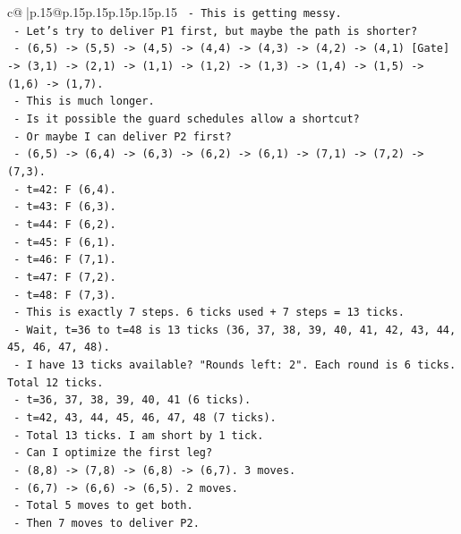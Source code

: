 \documentclass{article}
\begin{document}
{\begin{supertabular}{c@{$\;$}|p{.15\linewidth}@{}p{.15\linewidth}p{.15\linewidth}p{.15\linewidth}p{.15\linewidth}p{.15\linewidth}}
{{{\texttt{      {-} This is getting messy.} \\
\texttt{    {-} Let's try to deliver P1 first, but maybe the path is shorter?} \\
\texttt{      {-} (6,5) {-}> (5,5) {-}> (4,5) {-}> (4,4) {-}> (4,3) {-}> (4,2) {-}> (4,1) {[}Gate{]} {-}> (3,1) {-}> (2,1) {-}> (1,1) {-}> (1,2) {-}> (1,3) {-}> (1,4) {-}> (1,5) {-}> (1,6) {-}> (1,7).} \\
\texttt{      {-} This is much longer.} \\
\texttt{    {-} Is it possible the guard schedules allow a shortcut?} \\
\texttt{    {-} Or maybe I can deliver P2 first?} \\
\texttt{      {-} (6,5) {-}> (6,4) {-}> (6,3) {-}> (6,2) {-}> (6,1) {-}> (7,1) {-}> (7,2) {-}> (7,3).} \\
\texttt{      {-} t=42: F (6,4).} \\
\texttt{      {-} t=43: F (6,3).} \\
\texttt{      {-} t=44: F (6,2).} \\
\texttt{      {-} t=45: F (6,1).} \\
\texttt{      {-} t=46: F (7,1).} \\
\texttt{      {-} t=47: F (7,2).} \\
\texttt{      {-} t=48: F (7,3).} \\
\texttt{      {-} This is exactly 7 steps. 6 ticks used + 7 steps = 13 ticks.} \\
\texttt{      {-} Wait, t=36 to t=48 is 13 ticks (36, 37, 38, 39, 40, 41, 42, 43, 44, 45, 46, 47, 48).} \\
\texttt{      {-} I have 13 ticks available? "Rounds left: 2". Each round is 6 ticks. Total 12 ticks.} \\
\texttt{      {-} t=36, 37, 38, 39, 40, 41 (6 ticks).} \\
\texttt{      {-} t=42, 43, 44, 45, 46, 47, 48 (7 ticks).} \\
\texttt{      {-} Total 13 ticks. I am short by 1 tick.} \\
\texttt{      {-} Can I optimize the first leg?} \\
\texttt{      {-} (8,8) {-}> (7,8) {-}> (6,8) {-}> (6,7). 3 moves.} \\
\texttt{      {-} (6,7) {-}> (6,6) {-}> (6,5). 2 moves.} \\
\texttt{      {-} Total 5 moves to get both.} \\
\texttt{      {-} Then 7 moves to deliver P2.} \\
}}}
\end{supertabular}}
\end{document}
